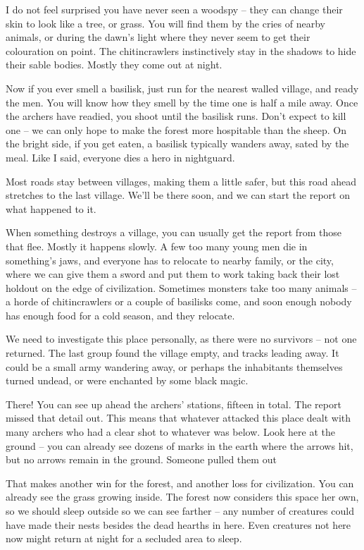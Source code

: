 \begin{multicols}{2}
\begin{exampletext}
	I do not feel surprised you have never seen a woodspy -- they can change their skin to look like a tree, or grass.
	You will find them by the cries of nearby animals, or during the dawn's light where they never seem to get their colouration on point.
	The chitincrawlers instinctively stay in the shadows to hide their sable bodies.
	Mostly they come out at night.

	Now if you ever smell a basilisk, just run for the nearest walled village, and ready the men.
	You will know how they smell by the time one is half a mile away.
	Once the archers have readied, you shoot until the basilisk runs.
	Don't expect to kill one -- we can only hope to make the forest more hospitable than the sheep.
	On the bright side, if you get eaten, a basilisk typically wanders away, sated by the meal.
	Like I said, everyone dies a hero in \gls{nightguard}.

	Most roads stay between villages, making them a little safer, but this road ahead stretches to the last village.
	We'll be there soon, and we can start the report on what happened to it.

	When something destroys a village, you can usually get the report from those that flee.
	Mostly it happens slowly.
	A few too many young men die in something's jaws, and everyone has to relocate to nearby family, or the city, where we can give them a sword and put them to work taking back their lost holdout on the edge of civilization.
	Sometimes monsters take too many animals -- a horde of chitincrawlers or a couple of basilisks come, and soon enough nobody has enough food for a cold season, and they relocate.

	We need to investigate this place personally, as there were no survivors -- not one returned.
	The last group found the village empty, and tracks leading away.
	It could be a small army wandering away, or perhaps the inhabitants themselves turned undead, or were enchanted by some black magic.

	There! You can see up ahead the archers' stations, fifteen in total.
	The report missed that detail out.
	This means that whatever attacked this place dealt with many archers who had a clear shot to whatever was below.
	Look here at the ground -- you can already see dozens of marks in the earth where the arrows hit, but no arrows remain in the ground.
	Someone pulled them out

	That makes another win for the forest, and another loss for civilization.
	You can already see the grass growing inside.
	The forest now considers this space her own, so we should sleep outside so we can see farther -- any number of creatures could have made their nests besides the dead hearths in here.
	Even creatures not here now might return at night for a secluded area to sleep.


\end{exampletext}
\end{multicols}
